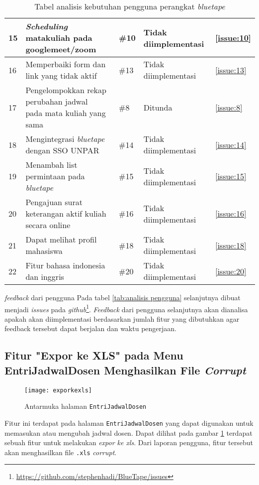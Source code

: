 \begin{table}[H]
{\begin{tabular}{|l|l|l|l|l|}
	15 & \textit{Scheduling} matakuliah pada googlemeet/zoom & \#10 & Tidak diimplementasi & \ref{issue:10} \\ \hline
	16 & Memperbaiki form dan link yang tidak aktif & \#13 & Tidak diimplementasi & \ref{issue:13}\\ \hline
	17 & \makecell[l]{Pengelompokkan rekap perubahan jadwal\\ pada mata kuliah yang sama} & \#8 & Ditunda & \ref{issue:8}\\ \hline
	18 & Mengintegrasi \textit{bluetape} dengan SSO UNPAR & \#14 & Tidak diimplementasi & \ref{issue:14}\\ \hline
	19 & Menambah list permintaan pada \textit{bluetape} & \#15 & Tidak diimplementasi & \ref{issue:15} \\ \hline
	20 & Pengajuan surat keterangan aktif kuliah secara online & \#16 & Tidak diimplementasi & \ref{issue:16} \\ \hline
	21 & Dapat melihat profil mahasiswa & \#18 & Tidak diimplementasi & \ref{issue:18}\\ \hline
	22 & Fitur bahasa indonesia dan inggris &  \#20 & Tidak diimplementasi & \ref{issue:20} \\ \hline

	
	
	\end{tabular}}
	\caption{Tabel analisis kebutuhan pengguna perangkat \textit{bluetape}}
\end{table}


\textit{feedback} dari pengguna Pada tabel \ref{tab:analisis pengguna} selanjutnya dibuat menjadi \textit{issues} pada \textit{github}\footnote{\url{https://github.com/stephenhadi/BlueTape/issues}}. \textit{Feedback} dari pengguna selanjutnya akan dianalisa apakah akan diimplementasi berdasarkan jumlah fitur yang dibutuhkan agar feedback tersebut dapat berjalan dan waktu pengerjaan.


\subsection{Fitur "Expor ke XLS" pada Menu EntriJadwalDosen Menghasilkan File  \textit{Corrupt}}
\label{issue:1}
\begin{figure}[H]
	\centering
	\texttt{[image: exporkexls]} 
	\caption{Antarmuka halaman \texttt{EntriJadwalDosen}}
	\label{fig:EntriJadwalDosen} 
\end{figure}

Fitur ini terdapat pada halaman \texttt{EntriJadwalDosen} yang dapat digunakan untuk memasukan atau mengubah jadwal dosen. Dapat dilihat pada gambar \ref{fig:EntriJadwalDosen} terdapat sebuah fitur untuk melakukan \textit{expor ke xls}. Dari laporan pengguna, fitur tersebut akan menghasilkan file \texttt{.xls} \textit{corrupt}.

